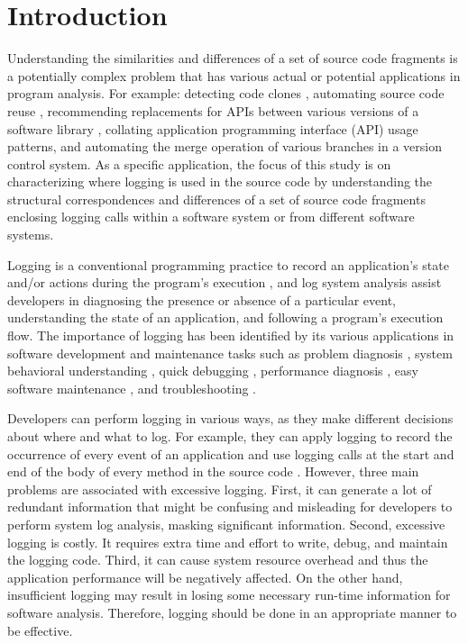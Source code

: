 
\chapter{Introduction}  \label{Introduction}

Understanding the similarities and differences of a set of source code fragments is a potentially complex problem that has various actual or potential applications in program analysis. For example: detecting code clones \cite{bulychev2009evaluation}, automating source code reuse \cite{cottrell2008semi}, recommending replacements for APIs between various versions of a software library \cite{cossette2014using}, collating application programming interface (API) usage patterns, and automating the merge operation of various branches in a version control system. As a specific application, the focus of this study is on characterizing where logging is used in the source code by understanding the structural correspondences and differences of a set of source code fragments enclosing logging calls within a software system or from different software systems.

Logging is a conventional programming practice to record an application's state and/or actions during the program's execution \cite{gupta2005pro}, and log system analysis assist developers in diagnosing the presence or absence of a particular event,  understanding the state of an application, and following a program's execution flow. The importance of logging has been identified by its various applications in software development and maintenance tasks such as problem diagnosis \cite{lou2010mining}, system behavioral understanding \cite{fu2013contextual}, quick debugging \cite{gupta2005pro}, performance diagnosis \cite{nagaraj2012structured}, easy software maintenance \cite{gupta2005pro}, and troubleshooting \cite{fu2009execution}.

Developers can perform logging in various ways, as they make different decisions about where and what to log. For example, they can apply logging to record the occurrence of every event of an application and use logging calls at the start and end of the body of every method in the source code \cite{clarke1999dimension,clarke1999subject}. However, three main problems are associated with excessive logging. First, it can generate a lot of redundant information that might be confusing and misleading for developers to perform system log analysis, masking significant information. Second, excessive logging is costly. It requires extra time and effort to write, debug, and maintain the logging code. Third, it can cause system resource overhead and thus the application performance will be negatively affected. On the other hand, insufficient logging may result in losing some necessary run-time information for software analysis.
Therefore, logging should be done in an appropriate manner to be effective.


